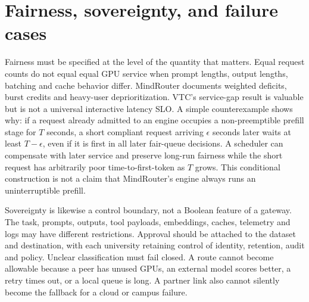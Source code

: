 \section{Fairness, sovereignty, and failure cases}
Fairness must be specified at the level of the quantity that matters. Equal request counts do not equal equal GPU service when prompt lengths, output lengths, batching and cache behavior differ. MindRouter documents weighted deficits, burst credits and heavy-user deprioritization. VTC's service-gap result is valuable but is not a universal interactive latency SLO. A simple counterexample shows why: if a request already admitted to an engine occupies a non-preemptible prefill stage for $T$ seconds, a short compliant request arriving $\epsilon$ seconds later waits at least $T-\epsilon$, even if it is first in all later fair-queue decisions. A scheduler can compensate with later service and preserve long-run fairness while the short request has arbitrarily poor time-to-first-token as $T$ grows. This conditional construction is not a claim that MindRouter's engine always runs an uninterruptible prefill.

Sovereignty is likewise a control boundary, not a Boolean feature of a gateway. The task, prompts, outputs, tool payloads, embeddings, caches, telemetry and logs may have different restrictions. Approval should be attached to the dataset and destination, with each university retaining control of identity, retention, audit and policy. Unclear classification must fail closed. A route cannot become allowable because a peer has unused GPUs, an external model scores better, a retry times out, or a local queue is long. A partner link also cannot silently become the fallback for a cloud or campus failure.

